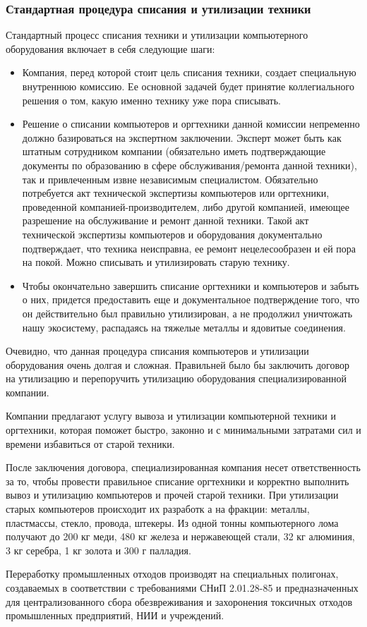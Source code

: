 \subsubsection{Стандартная процедура списания и утилизации техники}
Стандартный процесс списания техники и утилизации компьютерного оборудования включает в себя следующие шаги:
\begin{itemize}
\item Компания, перед которой стоит цель списания техники, создает специальную внутреннюю комиссию. Ее основной задачей будет принятие коллегиального решения о том, какую именно технику уже пора списывать.
\item Решение о списании компьютеров и оргтехники данной комиссии непременно должно базироваться на экспертном заключении. Эксперт может быть как штатным сотрудником компании (обязательно иметь подтверждающие документы по образованию в сфере обслуживания/ремонта данной техники), так и привлеченным извне независимым специалистом. Обязательно потребуется акт технической экспертизы компьютеров или оргтехники, проведенной компанией-производителем, либо другой компанией, имеющее разрешение на обслуживание и ремонт данной техники. Такой акт технической экспертизы компьютеров и оборудования документально подтверждает, что техника неисправна, ее ремонт нецелесообразен и ей пора на  покой. Можно списывать и утилизировать старую технику.
\item Чтобы окончательно завершить списание оргтехники и компьютеров и забыть о  них, придется предоставить еще и документальное подтверждение того, что он  действительно был правильно утилизирован, а не продолжил уничтожать нашу экосистему, распадаясь на тяжелые металлы и ядовитые соединения.

\end{itemize}

Очевидно, что данная процедура списания компьютеров и утилизации оборудования очень долгая и сложная. Правильней было бы заключить договор на утилизацию и перепоручить  утилизацию оборудования специализированной компании.

Компании предлагают услугу вывоза и утилизации компьютерной техники и оргтехники, которая поможет быстро, законно и с минимальными затратами сил и времени избавиться от старой техники. 

После заключения договора, специализированная компания несет ответственность за то, чтобы провести правильное списание оргтехники и корректно выполнить вывоз и утилизацию компьютеров и прочей старой техники.
При утилизации старых компьютеров происходит их разработк
а на фракции: металлы, пластмассы, стекло, провода, штекеры. Из одной тонны компьютерного лома получают до 200 кг меди, 480 кг железа и нержавеющей стали, 32 кг алюминия, 3 кг серебра, 1 кг золота и 300 г палладия.

Переработку промышленных отходов производят на специальных полигонах, создаваемых в соответствии с требованиями СНиП 2.01.28-85 и предназначенных для централизованного сбора обезвреживания и захоронения токсичных отходов промышленных предприятий, НИИ и учреждений.
